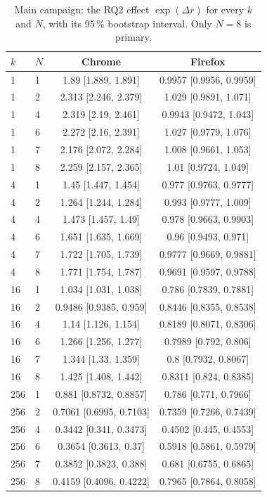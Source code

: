 \begin{table}[htbp]
\caption{Main campaign: the RQ2 effect $\exp(\Delta r)$ for every $k$ and $N$, with its 95\,\% bootstrap interval. Only $N=8$ is primary.}\label{tab:rq2-all}
\centering\small
\begin{tabular}{llcc}
\toprule
$k$ & $N$ & Chrome & Firefox \\
\midrule
1 & 1 & 1.89 [1.889, 1.891] & 0.9957 [0.9956, 0.9959] \\
1 & 2 & 2.313 [2.246, 2.379] & 1.029 [0.9891, 1.071] \\
1 & 4 & 2.319 [2.19, 2.461] & 0.9943 [0.9472, 1.043] \\
1 & 6 & 2.272 [2.16, 2.391] & 1.027 [0.9779, 1.076] \\
1 & 7 & 2.176 [2.072, 2.284] & 1.008 [0.9661, 1.053] \\
1 & 8 & 2.259 [2.157, 2.365] & 1.01 [0.9724, 1.049] \\
\midrule
4 & 1 & 1.45 [1.447, 1.454] & 0.977 [0.9763, 0.9777] \\
4 & 2 & 1.264 [1.244, 1.284] & 0.993 [0.9777, 1.009] \\
4 & 4 & 1.473 [1.457, 1.49] & 0.978 [0.9663, 0.9903] \\
4 & 6 & 1.651 [1.635, 1.669] & 0.96 [0.9493, 0.971] \\
4 & 7 & 1.722 [1.705, 1.739] & 0.9777 [0.9669, 0.9881] \\
4 & 8 & 1.771 [1.754, 1.787] & 0.9691 [0.9597, 0.9788] \\
\midrule
16 & 1 & 1.034 [1.031, 1.038] & 0.786 [0.7839, 0.7881] \\
16 & 2 & 0.9486 [0.9385, 0.959] & 0.8446 [0.8355, 0.8538] \\
16 & 4 & 1.14 [1.126, 1.154] & 0.8189 [0.8071, 0.8306] \\
16 & 6 & 1.266 [1.256, 1.277] & 0.7989 [0.792, 0.806] \\
16 & 7 & 1.344 [1.33, 1.359] & 0.8 [0.7932, 0.8067] \\
16 & 8 & 1.425 [1.408, 1.442] & 0.8311 [0.824, 0.8385] \\
\midrule
256 & 1 & 0.881 [0.8732, 0.8857] & 0.786 [0.771, 0.7966] \\
256 & 2 & 0.7061 [0.6995, 0.7103] & 0.7359 [0.7266, 0.7439] \\
256 & 4 & 0.3442 [0.341, 0.3473] & 0.4502 [0.445, 0.4553] \\
256 & 6 & 0.3654 [0.3613, 0.37] & 0.5918 [0.5861, 0.5979] \\
256 & 7 & 0.3852 [0.3823, 0.388] & 0.681 [0.6755, 0.6865] \\
256 & 8 & 0.4159 [0.4096, 0.4222] & 0.7965 [0.7864, 0.8058] \\
\bottomrule
\end{tabular}
\end{table}
